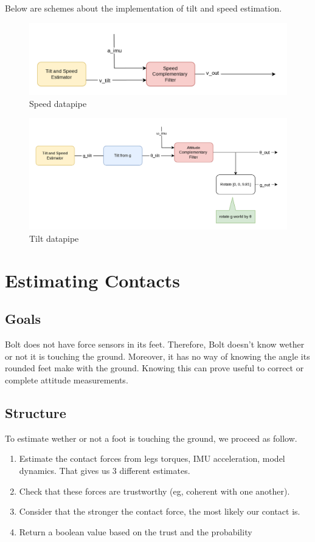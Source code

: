 \documentclass[a4paper,10pt]{article}
\begin{document}
Below are schemes about the implementation of tilt and speed estimation.
\begin{figure}[H]
\centering
  \includegraphics[width=\linewidth, angle=0, scale=0.6]{./images/Variable_Speed.png}
  \caption{Speed datapipe}
\end{figure}

\begin{figure}[H]
\centering
  \includegraphics[width=\linewidth, angle=0, scale=0.7]{./images/Variable_Attitude.png}
  \caption{Tilt datapipe}
\end{figure}


\section{Estimating Contacts}
\subsection{Goals}
Bolt does not have force sensors in its feet. Therefore, Bolt doesn't know wether or not it is touching the ground. Moreover, it has no way of knowing the angle its rounded feet make with the ground. Knowing this can prove useful to correct or complete attitude measurements.

\subsection{Structure}
To estimate wether or not a foot is touching the ground, we proceed as follow.
\begin{enumerate}[noitemsep,topsep=0.5pt,parsep=0.1pt,partopsep=0.1pt]
	\item Estimate the contact forces from legs torques, IMU acceleration, model dynamics. That gives us 3 different estimates.
	\item Check that these forces are trustworthy (eg, coherent with one another).
	\item Consider that the stronger the contact force, the most likely our contact is.
	\item Return a boolean value based on the trust and the probability
\end{enumerate}
\end{document}
